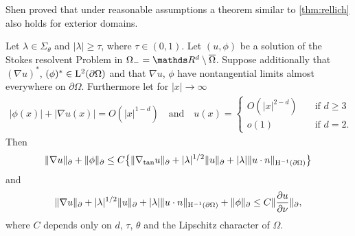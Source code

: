 Shen proved that under reasonable assumptions a theorem similar to \ref{thm:rellich} also holds for exterior domains.

\begin{thm}
  \label{thm:rellichExterior}
  Let $\lambda \in \Sigma_\theta$ and $|\lambda| \geq \tau$, where $\tau \in (0,1)$.
  Let $(u,\phi)$ be a solution of the Stokes resolvent Problem in $\Omega_- = \R^d \setminus \overline\Omega$.
  Suppose additionally that $(\nabla u)^*$, $(\phi)^* \in \mathrm{L}^2(\partial\Omega)$ and that $\nabla u$, $\phi$ have nontangential limits almost everywhere on $\partial\Omega$.
  Furthermore let for $|x| \to \infty$
  \begin{align*}
    |\phi(x)| + |\nabla u(x)| = O(|x|^{1 - d}) \quad\text{and}\quad 
    u(x) = \begin{cases} O(|x|^{2 - d}) &\quad\text{if } d \geq 3 \\ o(1) &\quad\text{if } d = 2. \end{cases}
  \end{align*}
  Then
  \begin{align}
    \label{eq:rellich1ext}
    \|\nabla u\|_\partial + \|\phi\|_\partial
    \leq C \big\{ \|\nabla_{\mathrm{tan}} u\|_\partial + |\lambda|^{1/2} \|u\|_\partial + |\lambda| \|u \cdot n\|_{\mathrm{H}^{-1}(\partial\Omega)} \big\}
  \end{align}
  and
  \begin{align}
    \label{eq:rellich2ext}
    \|\nabla u\|_\partial + |\lambda|^{1/2} \|u\|_\partial + |\lambda| \|u \cdot n\|_{\mathrm{H}^{-1}(\partial\Omega)} + \|\phi\|_\partial
    \leq C \|\frac{\partial u}{\partial \nu} \|_\partial,
  \end{align}
  where $C$ depends only on $d$, $\tau$, $\theta$ and the Lipschitz character of $\Omega$.
\end{thm}

